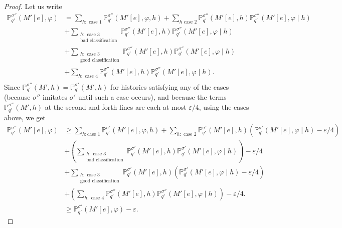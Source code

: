 \documentclass[a4paper,USenglish,cleveref, autoref, thm-restate]{lipics-v2021}
\let\epsilon\varepsilon
\newcommand*{\pr}{\mathbb{P}}
\begin{document}
\begin{proof}
  Let us write
  \begin{align*}
    \pr_{q'}^{\sigma''}(M'[e], \varphi ) &= \sum_{h : \text{ case 1}} \pr_{q'}^{\sigma''}(M'[e],\varphi, h) + \sum_{h \text{ case 2}} \pr_{q'}^{\sigma''}(M'[e],h) \pr_{q'}^{\sigma''}(M'[e],\varphi \mid h)\\
                                      &+ \sum_{\substack{h : \text{ case 3}\\\text{bad classification}}} \pr_{q'}^{\sigma''}(M'[e],h) \pr_{q'}^{\sigma''}(M'[e],\varphi \mid h)\\
                                      &+ \sum_{\substack{h : \text{ case 3}\\\text{good classification}}} \pr_{q'}^{\sigma''}(M'[e],h) \pr_{q'}^{\sigma''}(M'[e],\varphi \mid h)\\
                                      &+ \sum_{h : \text{ case 4}} \pr_{q'}^{\sigma''}(M'[e],h) \pr_{q'}^{\sigma''}(M'[e],\varphi \mid h).\\
  \end{align*}
  Since $\pr_{q'}^{\sigma''}(M',h ) = \pr_{q'}^{\sigma'}(M', h)$ for histories satisfying any of the cases (because $\sigma''$ imitates $\sigma'$ until such a case occurs),
  and because the terms $\pr_{q'}^{\sigma''}(M',h )$ at the second and forth lines are each at most $\epsilon/4$, using the cases above, we get
  \begin{align*}
    \pr_{q'}^{\sigma''}(M'[e], \varphi ) &{\geq} \sum_{h : \text{case 1}} \pr_{q'}^{\sigma'}(M'[e],\varphi, h) {+} \sum_{h:\text{ case 2}} \pr_{q'}^{\sigma'}(M'[e],h) (\pr_{q'}^{\sigma'}(M'[e],\varphi{\mid} h){-}\epsilon{/}4)\\
                                      &+ \left(\sum_{\substack{h : \text{ case 3}\\\text{bad classification}}} \pr_{q'}^{\sigma'}(M'[e],h) \pr_{q'}^{\sigma'}(M'[e],\varphi \mid h)\right)-\epsilon/4\\
                                      &+ \sum_{\substack{h : \text{ case 3}\\\text{good classification}}} \pr_{q'}^{\sigma'}(M'[e],h) (\pr_{q'}^{\sigma'}(M'[e],\varphi \mid h)-\epsilon/4)\\
                                      &+ \left(\sum_{h : \text{ case 4}} \pr_{q'}^{\sigma''}(M'[e],h) \pr_{q'}^{\sigma''}(M'[e],\varphi \mid h)\right)-\epsilon/4.\\
                                      &\geq \pr_{q'}^{\sigma'}(M'[e], \varphi ) -\epsilon.
  \end{align*}

\end{proof}
\end{document}
